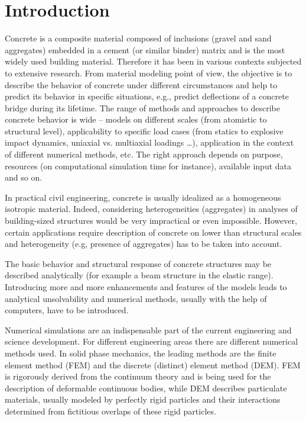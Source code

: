 \chapter{Introduction}

Concrete is a composite material composed of inclusions (gravel and sand aggregates) embedded in a cement (or similar binder) matrix and is the most widely used building material.
Therefore it has been in various contexts subjected to extensive research.
From material modeling point of view, the objective is to describe the behavior of concrete under different circumstances and help to predict its behavior in specific situations, e.g., predict deflections of a concrete bridge during its lifetime.
The range of methods and approaches to describe concrete behavior is wide -- models on different scales (from atomistic to structural level), applicability to specific load cases (from statics to explosive impact dynamics, uniaxial vs. multiaxial loadings \dots), application in the context of different numerical methods, etc.
The right approach depends on purpose, resources (on computational simulation time for instance), available input data and so on.

In practical civil engineering, concrete is usually idealized as a homogeneous isotropic material.
Indeed, considering heterogeneities (aggregates) in analyses of building-sized structures would be very impractical or even impossible.
However, certain applications require description of concrete on lower than structural scales and heterogeneity (e.g, presence of aggregates) has to be taken into account.

The basic behavior and structural response of concrete structures may be described analytically (for example a beam structure in the elastic range).
Introducing more and more enhancements and features of the models leads to analytical unsolvability and numerical methods, usually with the help of computers, have to be introduced.


Numerical simulations are an indispensable part of the current engineering and science development.
For different engineering areas there are different numerical methods used.
In solid phase mechanics, the leading methods are the finite element method (FEM) and the discrete (distinct) element method (DEM).
FEM is rigorously derived from the continuum theory and is being used for the description of deformable continuous bodies, while DEM describes particulate materials, usually modeled by perfectly rigid particles and their interactions determined from fictitious overlaps of these rigid particles.

